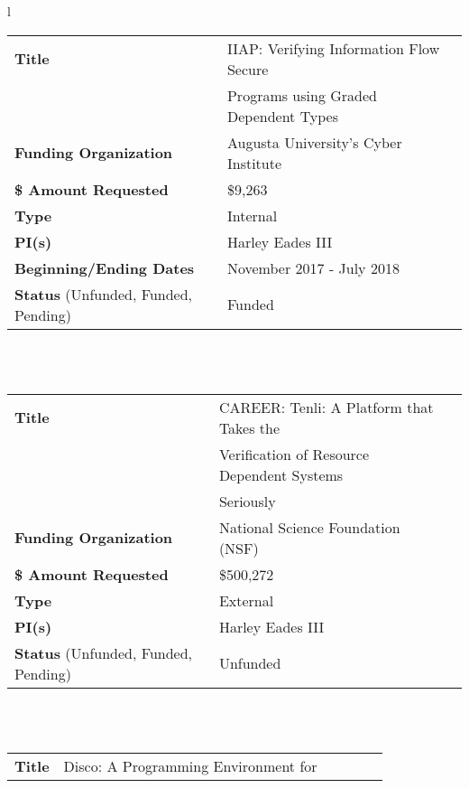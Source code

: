 \documentclass[11pt]{article}
\begin{document}
    \begin{tabular}{l}
      \begin{tabular}{|l|l|l|}
          \hline
          \textbf{Title} & IIAP: Verifying Information Flow Secure \,\,\,\,\,\,\,\,\,\,\,\,\,\,\, \\
          & Programs using Graded Dependent Types\\
          \hline
          \textbf{Funding Organization} & Augusta University's Cyber Institute\\
          \hline
          \textbf{\$ Amount Requested} & \$9,263\\
          \hline
          \textbf{Type} & Internal\\
          \hline
          \textbf{PI(s)} & Harley Eades III\\
          \hline
          \textbf{Beginning/Ending Dates} & November 2017 - July 2018\\
          \hline
          \textbf{Status} (Unfunded, Funded, Pending) & Funded\\
          \hline
        \end{tabular}\\
        \\        
      \begin{tabular}{|l|l|l|}
          \hline
          \textbf{Title} & CAREER: Tenli: A Platform that Takes the\,\,\,\,\,\,\, \\
          & Verification of Resource Dependent Systems \\
          & Seriously\\
          \hline
          \textbf{Funding Organization} & National Science Foundation (NSF)\\
          \hline
          \textbf{\$ Amount Requested} & \$500,272\\
          \hline
          \textbf{Type} & External\\
          \hline
          \textbf{PI(s)} & Harley Eades III\\
          \hline
          \textbf{Status} (Unfunded, Funded, Pending) & Unfunded\\
          \hline
        \end{tabular}\\
        \\        
      \begin{tabular}{|l|l|l|}
          \hline
          \textbf{Title} & Disco: A Programming Environment for \,\,\,\,\,\,\,\,\,\,\,\,\,\,\,\,\\

\end{tabular}
\end{tabular}
\end{document}
